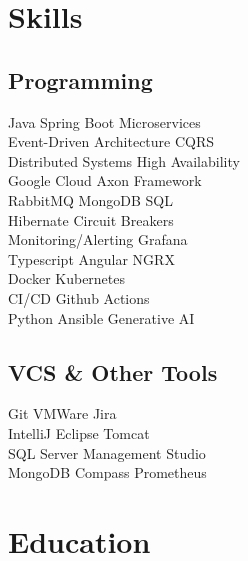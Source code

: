 \begin{minipage}[t]{0.33\textwidth}


\section{Skills}
\subsection{Programming}
\textbullet{} Java \textbullet{} Spring Boot \textbullet{} Microservices \\
\textbullet{} Event-Driven Architecture \textbullet{} CQRS \\
\textbullet{} Distributed Systems \textbullet{} High Availability \\
\textbullet{} Google Cloud \textbullet{} Axon Framework \\
\textbullet{} RabbitMQ \textbullet{} MongoDB \textbullet{} SQL \\
\textbullet{} Hibernate \textbullet{} Circuit Breakers \\
\textbullet{} Monitoring/Alerting \textbullet{} Grafana \\
\textbullet{} Typescript \textbullet{} Angular NGRX \\
\textbullet{} Docker \textbullet{} Kubernetes \\
\textbullet{} CI/CD \textbullet{} Github Actions \\
\textbullet{} Python \textbullet{} Ansible \textbullet{} Generative AI

\vspace{\topsep}
\subsection{VCS \& Other Tools}
\textbullet{} Git \textbullet{} VMWare \textbullet{} Jira \\
\textbullet{} IntelliJ \textbullet{} Eclipse \textbullet{} Tomcat \\
\textbullet{} SQL Server Management Studio \\
\textbullet{} MongoDB Compass \textbullet{} Prometheus

\sectionsep


\section{Education}

\end{minipage}
